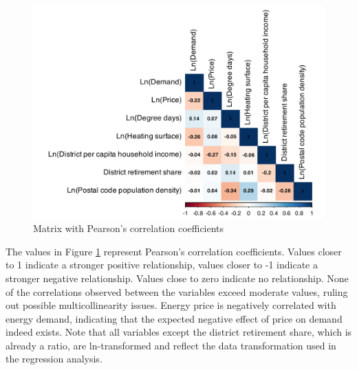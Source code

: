 \documentclass[12pt,twoside]{reedthesis}
\begin{document}
\newpage
\begin{figure}

{\centering \includegraphics[width=0.9\linewidth]{figure/correlation_matrix} 

}

\caption{Matrix with Pearson’s correlation coefficients}\label{fig:correlation-plot}
\end{figure}
\noindent
The values in Figure \ref{fig:correlation-plot} represent Pearson's correlation coefficients. Values closer to 1 indicate a stronger positive relationship, values closer to -1 indicate a stronger negative relationship. Values close to zero indicate no relationship. None of the correlations observed between the variables exceed moderate values, ruling out possible multicollinearity issues. Energy price is negatively correlated with energy demand, indicating that the expected negative effect of price on demand indeed exists. Note that all variables except the district retirement share, which is already a ratio, are ln-transformed and reflect the data transformation used in the regression analysis.
\end{document}
